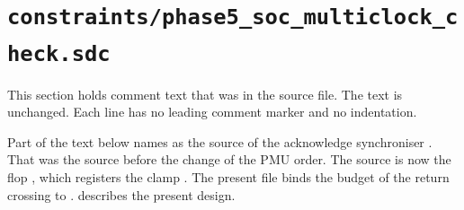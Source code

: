 \section{\texttt{constraints/phase5\_soc\_multiclock\_check.sdc}}\label{tm:pd:phase5-soc-multiclock-check-sdc}

This section holds comment text that was in the source file. The text is unchanged. Each line has no leading comment marker and no indentation.

\begin{information}
Part of the text below names  as the source of the acknowledge synchroniser . That was the source before the change of the PMU order. The source is now the flop , which registers the clamp . The present file binds the budget of the return crossing to .  describes the present design.
\end{information}

